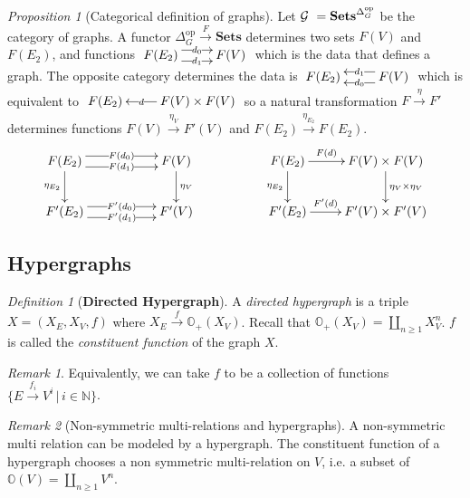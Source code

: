 \documentclass[10pt]{article}
\newcommand{\onearrow}[3]{\mbox{$#1 \stackrel{#2}{\longrightarrow} #3$}}
\newcommand{\calG}{\mbox{${\cal G}\ $}}
\theoremstyle{remark}
\newtheorem{remark}{Remark}
\newtheorem{definition}{Definition}
\newtheorem{proposition}{Proposition}
\begin{document}
\begin{proposition}[Categorical definition of graphs]
Let $\calG = \mathbf{Sets}^{\Delta_G^{\text{op}}}$ be the category of graphs.
A functor \onearrow{\Delta_G^{\text{op}}}{F}{\mathbf{Sets}} determines two sets $F(V)$ and $F(E_2)$, and functions
$\xymatrix{
     F(E_2) \ar@<1ex>[r]|-{d_0} \ar@<-1ex>[r]|-{d_1} & F(V)
     } $ which is the data that defines a graph. The opposite category determines the data is
$\xymatrix{
     F(E_2) & F(V) \ar@<1ex>[l]|-{d_0} \ar@<-1ex>[l]|-{d_1}
     }$ which is equivalent to
$\xymatrix{
     F(E_2) & F(V) \times F(V) \ar[l]|-{d}
     }$
so a natural transformation \onearrow{F}{\eta}{F'} determines functions \onearrow{F(V)}{\eta_V}{F'(V)} and \onearrow{F(E_2)}{\eta_{E_2}}{F(E_2)}.
$$
\xymatrix{ 
F(E_2) \ar@<1ex>[rr]|-{F(d_0)} \ar@<-1ex>[rr]|-{F(d_1)} \ar[d]_{\eta_{E_2}} & & F(V) \ar[d]^{\eta_V} & & F(E_2) \ar[r]^-{F(d)}  \ar[d]_{\eta_{E_2}} & F(V) \times F(V) \ar[d]^{\eta_V \times \eta_V} \\
F'(E_2) \ar@<1ex>[rr]|-{F'(d_0)} \ar@<-1ex>[rr]|-{F'(d_1)} & & F'(V) & & F'(E_2) \ar[r]^-{F'(d)} & F'(V) \times F'(V)
}
$$
\end{proposition}

\subsection{Hypergraphs}

\begin{definition}[\textbf{Directed Hypergraph}]
A \emph{directed hypergraph} is a triple $X=(X_E, X_V, f)$ where \onearrow{X_E}{f}{\mathbb{O}_{+} (X_V)}.
Recall that $\mathbb{O}_+(X_V) = \coprod_{n \geq 1} X_V^{n}$. $f$ is called the \emph{constituent function} of the graph $X$.
\end{definition}

\begin{remark}
Equivalently, we can take $f$ to be a collection of functions $\{ \onearrow{E}{f_i}{V^i} \, | \, i \in \mathbb{N}\}$. 
\end{remark}

\begin{remark}[Non-symmetric multi-relations and hypergraphs]
A non-symmetric multi relation can be modeled by a hypergraph. The constituent function of a hypergraph chooses a non symmetric multi-relation on $V$, i.e. a subset of $\mathbb{O}(V) = \coprod_{n \geq 1} V^{n}$.
\end{remark}
\end{document}
